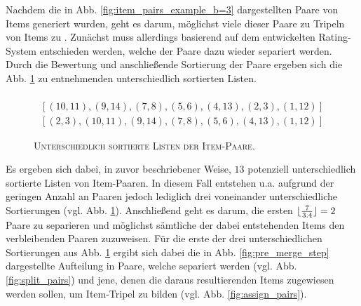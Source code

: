 Nachdem die in Abb. \ref{fig:item_pairs_example_b=3} dargestellten Paare von Items generiert wurden, geht es darum,
möglichst viele dieser Paare zu Tripeln von Items zu . Zunächst muss allerdings basierend auf dem entwickelten Rating-System entschieden werden, welche der Paare dazu wieder separiert werden. Durch die Bewertung und anschließende Sortierung der Paare ergeben sich die Abb. \ref{fig:lists_of_pairs} zu entnehmenden unterschiedlich sortierten Listen.

\vfill
\pagebreak

\begin{figure}[H]
\begin{gather*}
  [(2, 3), (4, 13), (10, 11), (9, 14), (7, 8), (5, 6), (1, 12)] \\
  [(10, 11), (9, 14), (7, 8), (5, 6), (4, 13), (2, 3), (1, 12)] \\
  [(2, 3), (10, 11), (9, 14), (7, 8), (5, 6), (4, 13), (1, 12)]
\end{gather*}
\caption{\textsc{Unterschiedlich sortierte Listen der Item-Paare}.}
\label{fig:lists_of_pairs}
\end{figure}
Es ergeben sich dabei, in zuvor beschriebener Weise, $13$ potenziell unterschiedlich sortierte Listen von Item-Paaren.
In diesem Fall entstehen u.a. aufgrund der geringen Anzahl an Paaren jedoch lediglich drei voneinander unterschiedliche
Sortierungen (vgl. Abb. \ref{fig:lists_of_pairs}).
Anschließend geht es darum, die ersten $\lfloor\frac{7}{3.4}\rfloor = 2$ Paare zu separieren und möglichst sämtliche der dabei entstehenden Items den verbleibenden Paaren zuzuweisen. Für die erste der drei unterschiedlichen Sortierungen aus Abb. \ref{fig:lists_of_pairs} ergibt sich dabei die in Abb. \ref{fig:pre_merge_step} dargestellte Aufteilung in Paare, welche separiert werden (vgl. Abb. \ref{fig:split_pairs}) und jene, denen die daraus resultierenden Items zugewiesen werden sollen,
um Item-Tripel zu bilden (vgl. Abb. \ref{fig:assign_pairs}).

